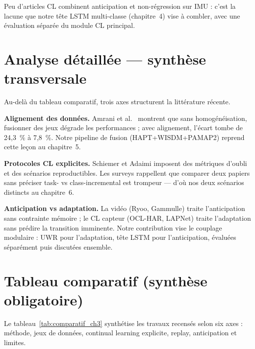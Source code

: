 \documentclass[a4paper,12pt]{report}
\begin{document}
Peu d'articles CL combinent anticipation et non-régression sur IMU : c'est la
lacune que notre tête LSTM multi-classe (chapitre~4) vise à combler, avec une
évaluation séparée du module CL principal.

\section{Analyse détaillée — synthèse transversale}

Au-delà du tableau comparatif, trois axes structurent la littérature récente.

\textbf{Alignement des données.} Amrani et al.\ \parencite{amrani2025} montrent
que sans homogénéisation, fusionner des jeux dégrade les performances ; avec
alignement, l'écart tombe de 24,3~\% à 7,8~\%. Notre pipeline de fusion
(HAPT+WISDM+PAMAP2) reprend cette leçon au chapitre~5.

\textbf{Protocoles CL explicites.} Schiemer \parencite{schiemer2023} et Adaimi
\parencite{adaimi2022} imposent des métriques d'oubli et des scénarios reproductibles.
Les surveys \parencite{delange2021,gu2021} rappellent que comparer deux papiers
sans préciser task- vs class-incremental est trompeur — d'où nos deux scénarios
distincts au chapitre~6.

\textbf{Anticipation vs adaptation.} La vidéo (Ryoo, Gammulle) traite l'anticipation
sans contrainte mémoire ; le CL capteur (OCL-HAR, LAPNet) traite l'adaptation sans
prédire la transition imminente. Notre contribution vise le couplage modulaire :
UWR pour l'adaptation, tête LSTM pour l'anticipation, évaluées séparément puis
discutées ensemble.

\section{Tableau comparatif (synthèse obligatoire)}

Le tableau~\ref{tab:comparatif_ch3} synthétise les travaux recensés selon six axes :
méthode, jeux de données, continual learning explicite, replay, anticipation et limites.
\end{document}
